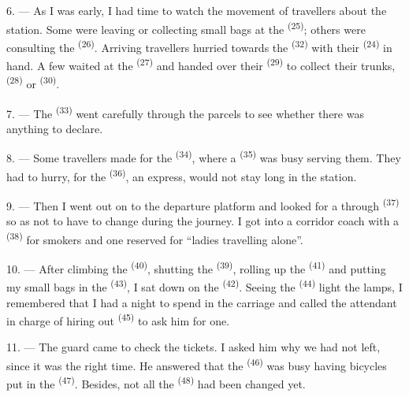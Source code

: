 6. --- As I was early, I had time to watch the movement of travellers about
the station. Some were leaving or collecting small bags at the
 \textsuperscript{(25)}; others were consulting the
 \textsuperscript{(26)}. Arriving travellers hurried towards the
 \textsuperscript{(32)} with their  \textsuperscript{(24)} in
hand. A few waited at the  \textsuperscript{(27)} and handed
over their  \textsuperscript{(29)} to collect their trunks,
 \textsuperscript{(28)} or  \textsuperscript{(30)}.

7. --- The  \textsuperscript{(33)} went carefully through the
parcels to see whether there was anything to declare.

8. --- Some travellers made for the  \textsuperscript{(34)},
where a  \textsuperscript{(35)} was busy serving them. They had to
hurry, for the  \textsuperscript{(36)}, an express, would not stay long
in the station.

9. --- Then I went out on to the departure platform and looked for a
through  \textsuperscript{(37)} so as not to have to change during the
journey. I got into a corridor coach with a 
\textsuperscript{(38)} for smokers and one reserved for “ladies travelling alone”.

\VUsaut{3.0mm}

10. --- After climbing the  \textsuperscript{(40)}, shutting the
 \textsuperscript{(39)}, rolling up the  \textsuperscript{(41)} and
putting my small bags in the  \textsuperscript{(43)}, I sat down
on the  \textsuperscript{(42)}. Seeing the  \textsuperscript{(44)}
light the lamps, I remembered that I had a night to spend in the carriage
and called the attendant in charge of hiring out 
\textsuperscript{(45)} to ask him for one.

11. --- The guard came to check the tickets. I asked him why we had not
left, since it was the right time. He answered that the
 \textsuperscript{(46)} was busy having bicycles put in the
 \textsuperscript{(47)}. Besides, not all the 
\textsuperscript{(48)} had been changed yet.

